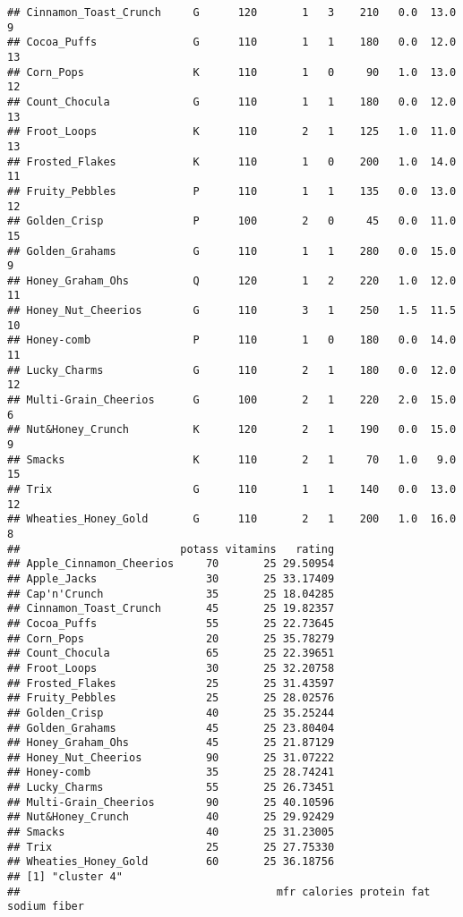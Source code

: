 \documentclass[
]{article}
\begin{document}
\begin{verbatim}
## Cinnamon_Toast_Crunch     G      120       1   3    210   0.0  13.0      9
## Cocoa_Puffs               G      110       1   1    180   0.0  12.0     13
## Corn_Pops                 K      110       1   0     90   1.0  13.0     12
## Count_Chocula             G      110       1   1    180   0.0  12.0     13
## Froot_Loops               K      110       2   1    125   1.0  11.0     13
## Frosted_Flakes            K      110       1   0    200   1.0  14.0     11
## Fruity_Pebbles            P      110       1   1    135   0.0  13.0     12
## Golden_Crisp              P      100       2   0     45   0.0  11.0     15
## Golden_Grahams            G      110       1   1    280   0.0  15.0      9
## Honey_Graham_Ohs          Q      120       1   2    220   1.0  12.0     11
## Honey_Nut_Cheerios        G      110       3   1    250   1.5  11.5     10
## Honey-comb                P      110       1   0    180   0.0  14.0     11
## Lucky_Charms              G      110       2   1    180   0.0  12.0     12
## Multi-Grain_Cheerios      G      100       2   1    220   2.0  15.0      6
## Nut&Honey_Crunch          K      120       2   1    190   0.0  15.0      9
## Smacks                    K      110       2   1     70   1.0   9.0     15
## Trix                      G      110       1   1    140   0.0  13.0     12
## Wheaties_Honey_Gold       G      110       2   1    200   1.0  16.0      8
##                         potass vitamins   rating
## Apple_Cinnamon_Cheerios     70       25 29.50954
## Apple_Jacks                 30       25 33.17409
## Cap'n'Crunch                35       25 18.04285
## Cinnamon_Toast_Crunch       45       25 19.82357
## Cocoa_Puffs                 55       25 22.73645
## Corn_Pops                   20       25 35.78279
## Count_Chocula               65       25 22.39651
## Froot_Loops                 30       25 32.20758
## Frosted_Flakes              25       25 31.43597
## Fruity_Pebbles              25       25 28.02576
## Golden_Crisp                40       25 35.25244
## Golden_Grahams              45       25 23.80404
## Honey_Graham_Ohs            45       25 21.87129
## Honey_Nut_Cheerios          90       25 31.07222
## Honey-comb                  35       25 28.74241
## Lucky_Charms                55       25 26.73451
## Multi-Grain_Cheerios        90       25 40.10596
## Nut&Honey_Crunch            40       25 29.92429
## Smacks                      40       25 31.23005
## Trix                        25       25 27.75330
## Wheaties_Honey_Gold         60       25 36.18756
## [1] "cluster 4"
##                                        mfr calories protein fat sodium fiber

\end{verbatim}
\end{document}
